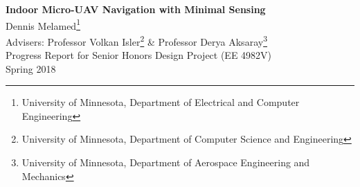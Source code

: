 \documentclass[12pt]{article}
\begin{document}
\begin{titlepage}
	\begin{center}
		\vspace{20pt}
		{\bf \LARGE Indoor Micro-UAV Navigation with Minimal Sensing} \\
		\vspace{200pt}
		Dennis Melamed\footnote{University of Minnesota, Department of Electrical and Computer Engineering} \\
		Advisers: Professor Volkan Isler\footnote{University of Minnesota, Department of Computer Science and Engineering} \& Professor Derya Aksaray\footnote{University of Minnesota, Department of Aerospace Engineering and Mechanics} \\
		Progress Report for Senior Honors Design Project (EE 4982V)\\
		Spring 2018 \\
	\end{center}
\end{titlepage}


\begin{abstract}
    The usage of a small UAV (unmanned aerial vehicle) with minimal sensing abilities to navigate complex indoor environments outside a motion capture system has not been well explored. This work reports on progress in developing a framework to fly out the door of a room from an arbitrary initial location using a micro-UAV with low-accuracy sensors. The sensing abilities will be limited by the payload of the UAV to a low-resolution camera and a low-accuracy IMU. The framework will consist of several interacting components: door detection (by a simple Hough transform procedure or a convolutional neural network), flight planning (via dead reckoning, a recurrent neural network, or a reinforcement learning network), and a lower level flight controller. The methods for door detection have been written and analyzed, with the convolutions neural network model showing significant advantages over the Hough transform based method. Some work still remains to make them usable. Initial groundwork for flight planning is also nearing completion, with a stable UAV payload designed and test flights completed. 
\end{abstract}

\tableofcontents
\end{document}
